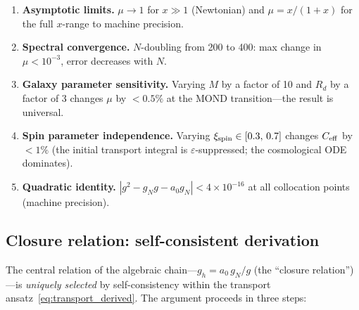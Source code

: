\documentclass[11pt]{article}
\begin{document}
\begin{enumerate}
\item \textbf{Asymptotic limits.}
  $\mu\to 1$ for $x\gg 1$ (Newtonian) and
  $\mu=x/(1+x)$ for the full $x$-range to machine precision.

\item \textbf{Spectral convergence.}
  $N$-doubling from 200 to 400: max change in $\mu<10^{-3}$,
  error decreases with $N$.

\item \textbf{Galaxy parameter sensitivity.}
  Varying $M$ by a factor of 10 and $R_d$ by a factor of 3
  changes $\mu$ by $<0.5\%$ at the MOND transition---the
  result is universal.

\item \textbf{Spin parameter independence.}
  Varying $\xi_{\rm spin}\in[0.3,\,0.7]$ changes $C_{\rm eff}$
  by $<1\%$ (the initial transport integral is
  $\varepsilon$-suppressed; the cosmological ODE dominates).

\item \textbf{Quadratic identity.}
  $|g^2-g_N g-a_0 g_N|<4\times10^{-16}$ at all
  collocation points (machine precision).
\end{enumerate}

\subsection{Closure relation: self-consistent derivation}
\label{sec:closure_derivation}

The central relation of the algebraic chain---$g_h = a_0\,g_N/g$
(the ``closure relation'')---is \emph{uniquely selected}
by self-consistency within the transport
ansatz~\eqref{eq:transport_derived}.
The argument proceeds in three steps:
\end{document}
